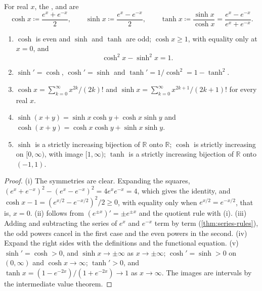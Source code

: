 \begin{definition}
\label{def:hyperbolic}
For real $x$, the ,  and  are
\[
\cosh x\coloneqq\frac{e^x+e^{-x}}2,\qquad\sinh x\coloneqq\frac{e^x-e^{-x}}2,\qquad\tanh x\coloneqq\frac{\sinh x}{\cosh x}=\frac{e^x-e^{-x}}{e^x+e^{-x}} .
\]
\end{definition}

\begin{proposition}
\label{prop:hyperbolic-properties}
\leavevmode
\begin{enumerate}
\item $\cosh$ is even and $\sinh$ and $\tanh$ are odd; $\cosh x\ge1$, with equality only at $x=0$, and
\[
\cosh^2x-\sinh^2x=1 .
\]
\item $\sinh'=\cosh$, $\cosh'=\sinh$ and $\tanh'=1/\cosh^2=1-\tanh^2$.
\item $\cosh x=\sum_{k=0}^\infty x^{2k}/(2k)!$ and $\sinh x=\sum_{k=0}^\infty x^{2k+1}/(2k+1)!$ for every real $x$.
\item $\sinh(x+y)=\sinh x\cosh y+\cosh x\sinh y$ and $\cosh(x+y)=\cosh x\cosh y+\sinh x\sinh y$.
\item $\sinh$ is a strictly increasing bijection of $\mathbb R$ onto $\mathbb R$; $\cosh$ is strictly increasing on $[0,\infty)$, with image $[1,\infty)$; $\tanh$ is a strictly increasing bijection of $\mathbb R$ onto $(-1,1)$.
\end{enumerate}
\end{proposition}

\begin{proof}
(i) The symmetries are clear. Expanding the squares, $(e^x+e^{-x})^2-(e^x-e^{-x})^2=4e^xe^{-x}=4$, which gives the identity, and $\cosh x-1=(e^{x/2}-e^{-x/2})^2/2\ge0$, with equality only when $e^{x/2}=e^{-x/2}$, that is, $x=0$. (ii) follows from $(e^{\pm x})'=\pm e^{\pm x}$ and the quotient rule with (i). (iii) Adding and subtracting the series of $e^x$ and $e^{-x}$ term by term (\cref{thm:series-rules}), the odd powers cancel in the first case and the even powers in the second. (iv) Expand the right sides with the definitions and the functional equation. (v) $\sinh'=\cosh>0$, and $\sinh x\to\pm\infty$ as $x\to\pm\infty$; $\cosh'=\sinh>0$ on $(0,\infty)$ and $\cosh x\to\infty$; $\tanh'>0$, and $\tanh x=(1-e^{-2x})/(1+e^{-2x})\to1$ as $x\to\infty$. The images are intervals by the intermediate value theorem.
\end{proof}

